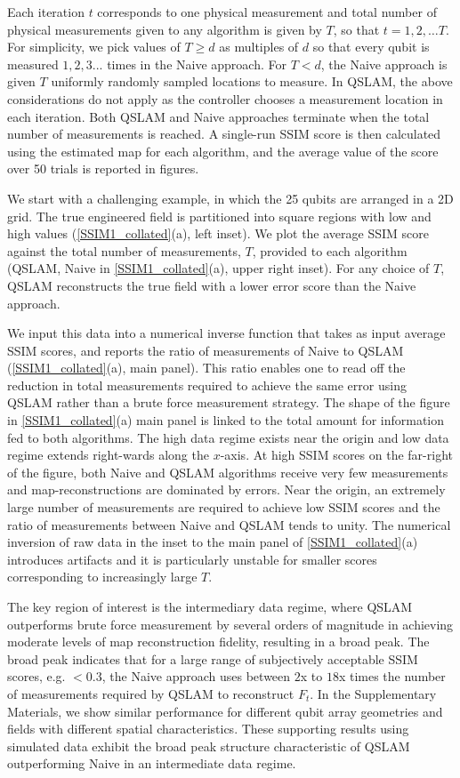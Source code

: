 \documentclass[reprint,longbibliography]{revtex4-1} %
\begin{document}
Each iteration $t$ corresponds to one physical measurement and total number of physical measurements given to any algorithm is given by $T$, so that $t = 1, 2, \hdots T$. For simplicity, we pick values of $T\geq d$ as multiples of $d$ so that every qubit is measured $1, 2, 3...$ times in the Naive approach.  For $T<d$,  the Naive approach is given $T$ uniformly randomly sampled locations to measure. In QSLAM, the above considerations do not apply as the controller chooses a measurement location in each iteration. Both QSLAM and Naive approaches terminate when the total number of measurements is reached. A single-run SSIM score is then calculated using the estimated map for each algorithm, and the average value of the score over 50 trials is reported in figures.

We start with a challenging example, in which the 25 qubits are arranged in a 2D grid. The true engineered field is partitioned into square regions with low and high values (\cref{SSIM1_collated}(a), left inset). We plot the average SSIM score against the total number of measurements, $T$, provided to each algorithm (QSLAM, Naive in \cref{SSIM1_collated}(a), upper right inset). For any choice of $T$, QSLAM reconstructs the true field with a lower error score than the Naive approach. 

We input this data into a numerical inverse function that takes as input average SSIM scores, and reports the ratio of measurements of Naive to QSLAM (\cref{SSIM1_collated}(a), main panel). This ratio enables one to read off the reduction in total measurements required to achieve the same error using QSLAM rather than a brute force measurement strategy. The shape of the figure in \cref{SSIM1_collated}(a) main panel is linked to the total amount for information fed to both algorithms. The high data regime exists near the origin and low data regime extends right-wards along the $x$-axis. At high SSIM scores on the far-right of the figure, both Naive and QSLAM algorithms receive very few measurements and map-reconstructions are dominated by errors. Near the origin, an extremely large number of measurements are required to achieve low SSIM scores and the ratio of measurements between Naive and QSLAM tends to unity. The numerical inversion  of raw data in the inset to the main panel of \cref{SSIM1_collated}(a) introduces artifacts and it is particularly unstable for smaller scores corresponding to increasingly large $T$. 

The key region of interest is the intermediary data regime, where QSLAM outperforms brute force measurement by several orders of magnitude in achieving moderate levels of map reconstruction fidelity, resulting in a broad peak. The broad peak indicates that for a large range of subjectively acceptable SSIM scores, e.g. $< 0.3$, the Naive approach uses between $2$x to $18$x times the number of measurements required by QSLAM to reconstruct $F_t$.  In the Supplementary Materials, we show similar performance for different qubit array geometries and fields with different spatial characteristics. These supporting results using simulated data exhibit the broad peak structure characteristic of QSLAM outperforming Naive in an intermediate data regime.
\end{document}
